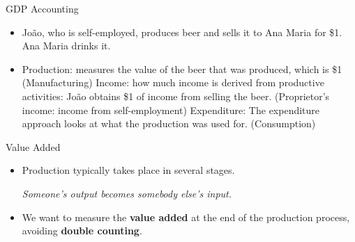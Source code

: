 \documentclass[10pt,aspectratio=169]{beamer}
\begin{document}
\begin{frame}{GDP Accounting}
\begin{itemize}
\item João, who is self-employed, produces beer and sells it to Ana Maria for \$1. 
\itemvso Ana Maria drinks it.
\end{itemize}

\vspace{0.5em}

\begin{table}[ht!]
\centering
\captionsetup{labelformat=empty}
\caption{\small  GDP from the three approaches (in dollars)}
\vspace{0.2em}
\end{table}
\begin{itemize}
\item Production: measures the value of the beer that was produced, which is \$1 (Manufacturing)
\itemvso Income: how much income is derived from productive activities: João obtains \$1 of income from selling the beer. (Proprietor's income: income from self-employment)
\itemvso Expenditure: The expenditure approach looks at what the production was used for. (Consumption)
\end{itemize}
\end{frame}

\begin{frame}{Value Added}
\begin{itemize}
    \item Production typically takes place in several stages. 
    \begin{center}
        \textit{Someone’s output becomes somebody else’s input.}
    \end{center}
    \vspace{0.4em}
    \item We want to measure the \textbf{value added} at the end of the production process, 
    avoiding \textbf{double counting}.
\end{itemize}
\end{frame}
\end{document}
